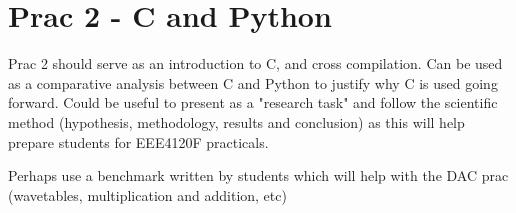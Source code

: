 \section{Prac 2 - C and Python}
Prac 2 should serve as an introduction to C, and cross compilation. Can be used as a comparative analysis between C and Python to justify why C is used going forward. Could be useful to present as a "research task" and follow the scientific method (hypothesis, methodology, results and conclusion) as this will help prepare students for EEE4120F practicals.


Perhaps use a benchmark written by students which will help with the DAC prac (wavetables, multiplication and addition, etc)

